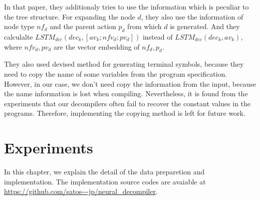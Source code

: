 \documentclass[senior,final,11pt]{iscs-thesis}
\begin{document}

In that paper, they additionaly tries to use the information which is peculiar to the tree structure. 
For expanding the node $d$, they also use the information of node type $ nf_{d} $ and the parent action $p_{d}$ from which $d$ is generated.
And they calculalte $ LSTM_{dec}(dec_{k},[av_{k}; nfv_{d}; pv_{d}]) $ instead of $ LSTM_{dec}(dec_{k},av_{k}) $, 
where $nfv_{d},pv_{d}$ are the vector embedding of $nf_{d},p_{d}$.

They also used devised method for generating terminal symbols, because they need to copy the name of some variables from the program specification.
However, in our case, we don't need copy the information from the input, because the name information is lost when compiling.
Nevertheless, it is found from the experiments that our decompilers often fail to recover the constant values in the programs.
Therefore, implementing the copying method is left for future work.



\chapter{Experiments}
In this chapter, we explain the detail of the data preparetion and implementation.
The implementation source codes are avaiable at \url{https://github.com/satos---jp/neural_decompiler}.  
\end{document}
